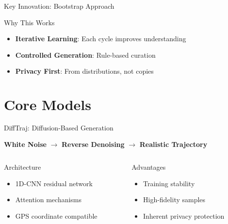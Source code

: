 \documentclass[aspectratio=169,xcolor={dvipsnames}]{beamer}
\begin{document}
\begin{frame}{Key Innovation: Bootstrap Approach}
  \begin{block}{Why This Works}
    \begin{itemize}
      \item \textbf{Iterative Learning}: Each cycle improves understanding
      \item \textbf{Controlled Generation}: Rule-based curation
      \item \textbf{Privacy First}: From distributions, not copies
    \end{itemize}
  \end{block}
\end{frame}

\section{Core Models}

\begin{frame}{DiffTraj: Diffusion-Based Generation}
  \begin{block}{}
    \centering
    \Large \textbf{White Noise} $\rightarrow$ \textbf{Reverse Denoising} $\rightarrow$ \textbf{Realistic Trajectory}
    
    \vspace{0.5em}
    \small \cite{zhuDiffTrajGeneratingGPS2023}
  \end{block}
  
  \vspace{1em}
  \begin{columns}[T,onlytextwidth]
    \begin{column}{0.48\textwidth}
      \begin{block}{Architecture}
        \begin{itemize}
          \item 1D-CNN residual network
          \item Attention mechanisms
          \item GPS coordinate compatible
        \end{itemize}
      \end{block}
    \end{column}
    \hspace{0.04\textwidth}
    \begin{column}{0.48\textwidth}
      \begin{block}{Advantages}
        \begin{itemize}
          \item Training stability
          \item High-fidelity samples
          \item Inherent privacy protection
        \end{itemize}
      \end{block}
    \end{column}
  \end{columns}
\end{frame}
\end{document}
